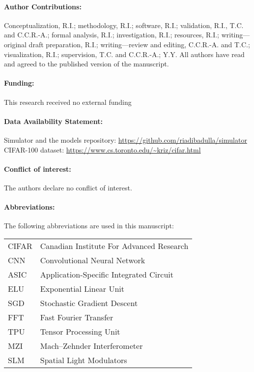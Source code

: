 \documentclass{article}
\begin{document}
\paragraph{Author Contributions:}
Conceptualization, R.I.; methodology, R.I.; software, R.I.; validation, R.I., T.C. and C.C.R.-A.; formal analysis, R.I.; investigation, R.I.; resources, R.I.; writing---original draft preparation, R.I.; writing---review and editing, C.C.R.-A. and T.C.; visualization, R.I.; supervision, T.C. and C.C.R.-A.; Y.Y. All authors have read and agreed to the published version of the manuscript.

\paragraph{Funding:}
This research received no external funding
\paragraph{Data Availability Statement:\\}
Simulator and the models repository: \url{https://github.com/riadibadulla/simulator}\\
CIFAR-100 dataset: \url{https://www.cs.toronto.edu/~kriz/cifar.html}
\paragraph{Conflict of interest:}
The authors declare no conflict of interest.

\paragraph{Abbreviations:\\}
The following abbreviations are used in this manuscript:\\
\noindent 
\begin{tabular}{@{}ll}
CIFAR & Canadian Institute For Advanced Research\\
CNN & Convolutional Neural Network\\
ASIC & Application-Specific Integrated Circuit\\
ELU & Exponential Linear Unit\\
SGD & Stochastic Gradient Descent \\
FFT & Fast Fourier Transfer\\
TPU & Tensor Processing Unit\\
MZI & Mach–Zehnder Interferometer\\
SLM & Spatial Light Modulators
\end{tabular}











  
\end{document}
